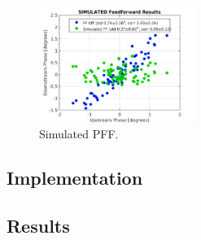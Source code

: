 \begin{figure}
  \centering
  \includegraphics[width=0.45\textwidth]{Figures/BestFF_Simulated}
  \caption{Simulated PFF.}
  \label{f:BestFF_Simulated}
\end{figure}




\subsection{Implementation}
\label{ss:slowCorrMethod}

\subsection{Results}
\label{ss:slowCorrResults}




